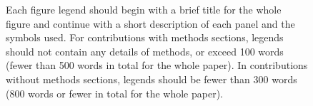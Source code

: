 \documentclass{nature}
\begin{document}
	
\begin{figure}
\caption{Each figure legend should begin with a brief title for
the whole figure and continue with a short description of each
panel and the symbols used. For contributions with methods
sections, legends should not contain any details of methods, or
exceed 100 words (fewer than 500 words in total for the whole
paper). In contributions without methods sections, legends should
be fewer than 300 words (800 words or fewer in total for the whole
paper).}
\end{figure}
   
\end{document}
